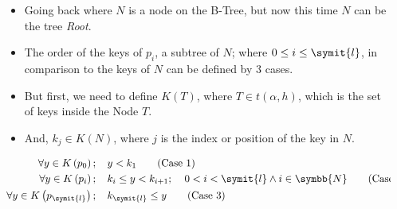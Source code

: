 \documentclass{beamer}
\begin{document}
\begin{frame}
    \begin{columns}
        \begin{column}{\textlecolumn}
            \begin{block}{}
                \begin{itemize}
                    \item Going back where \(N\) is a node on the B-Tree, but now this time \(N\) can be the tree \emph{Root}.
                    \item The order of the keys of \(p_i\), a subtree of \(N\); where \(0 \leq i \leq \symit{l}\), in comparison to the keys of \(N\) can be defined by 3 cases.
                    \item But first, we need to define \(K\left(T\right)\), where \(T \in t\left(\alpha, h\right)\), which is the set of keys inside the Node \(T\).
                    \item And, \(k_j \in K\left(N\right)\), where \(j\) is the index or position of the key in \(N\).
                \end{itemize}
                \vspace{0.5cm}
                \begin{align}
                    \forall y \in K\left(p_0\right);\mspace{20mu}& y < k_1 \tag{Case 1}\label{case1-subt-t-comp} \\
                    \forall y \in K\left(p_{i}\right);\mspace{20mu}& k_i \leq y < k_{i + 1};\mspace{20mu} 0 < i < \symit{l} \wedge i \in \symbb{N} \tag{Case 2}\label{case2-subt-t-comp} \\
                    \forall y \in K\left(p_{\symit{l}}\right);\mspace{20mu}& k_{\symit{l}} \leq y \tag{Case 3}\label{case3-subt-t-comp}
                \end{align}
            \end{block}
        \end{column}
        \begin{column}{\textricolumn}
            \begin{block}{}
            \end{block}
        \end{column}
    \end{columns}
    
    \framebreak


\end{frame}
\end{document}
